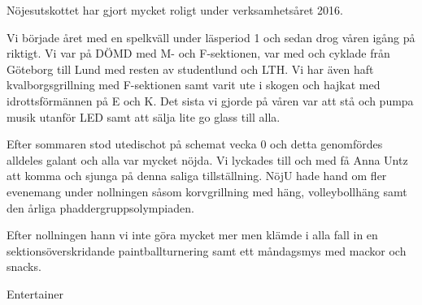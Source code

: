 \documentclass[../_main/handlingar.tex]{subfiles}
\begin{document}
Nöjesutskottet har gjort mycket roligt under verksamhetsåret 2016.

Vi började året med en spelkväll under läsperiod 1 och sedan drog våren igång på riktigt. Vi var på DÖMD med M- och F-sektionen, var med och cyklade från Göteborg till Lund med resten av studentlund och LTH. Vi har även haft kvalborgsgrillning med F-sektionen samt varit ute i skogen och hajkat med idrottsförmännen på E och K. Det sista vi gjorde på våren var att stå och pumpa musik utanför LED samt att sälja lite go glass till alla.

Efter sommaren stod utedischot på schemat vecka 0 och detta genomfördes alldeles galant och alla var mycket nöjda. Vi lyckades till och med få Anna Untz att komma och sjunga på denna saliga tillställning. NöjU hade hand om fler evenemang under nollningen såsom korvgrillning med häng, volleybollhäng samt den årliga phaddergruppsolympiaden.

Efter nollningen hann vi inte göra mycket mer men klämde i alla fall in en sektionsöverskridande paintballturnering samt ett måndagsmys med mackor och snacks.
\begin{signatures}{1}
    \mvh
    \signature{Dalia Dalia Khairallah}{Entertainer}
\end{signatures}
\end{document}
